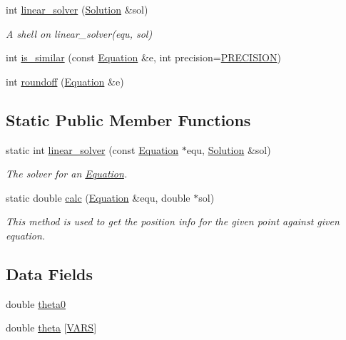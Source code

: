 \begin{DoxyCompactItemize}
int \hyperlink{classEquation_a9ce8d3263523f807d35592797e8efd1a}{linear\+\_\+solver} (\hyperlink{classSolution}{Solution} \&sol)
\begin{DoxyCompactList}\small\item\em A shell on linear\+\_\+solver(equ, sol) \end{DoxyCompactList}\item 
int \hyperlink{classEquation_afa602708c6dc480ebdb8d05a7a7d367c}{is\+\_\+similar} (const \hyperlink{classEquation}{Equation} \&e, int precision=\hyperlink{config_8h_a9c7b069fee3c8184e14a7de8e5da2dc6}{P\+R\+E\+C\+I\+S\+I\+ON})
\item 
int \hyperlink{classEquation_a337d5e20578e86ac30257622e03b1fe4}{roundoff} (\hyperlink{classEquation}{Equation} \&e)
\end{DoxyCompactItemize}
\subsection*{Static Public Member Functions}
\begin{DoxyCompactItemize}
\item 
static int \hyperlink{classEquation_a061e5066dffec79ea306546da919ddbf}{linear\+\_\+solver} (const \hyperlink{classEquation}{Equation} $\ast$equ, \hyperlink{classSolution}{Solution} \&sol)
\begin{DoxyCompactList}\small\item\em The solver for an \hyperlink{classEquation}{Equation}. \end{DoxyCompactList}\item 
static double \hyperlink{classEquation_ada446e2cdda9e86007ae08a4c0f6537a}{calc} (\hyperlink{classEquation}{Equation} \&equ, double $\ast$sol)
\begin{DoxyCompactList}\small\item\em This method is used to get the position info for the given point against given equation. \end{DoxyCompactList}\end{DoxyCompactItemize}
\subsection*{Data Fields}
\begin{DoxyCompactItemize}
\item 
double \hyperlink{classEquation_aa3da62783d229956703741c758b6fd69}{theta0}
\item 
double \hyperlink{classEquation_af346bba0364be7c84ebc969061d0315f}{theta} \mbox{[}\hyperlink{config_8h_a1d6565a8ececd15de44965eec4790919}{V\+A\+RS}\mbox{]}
\end{DoxyCompactItemize}
